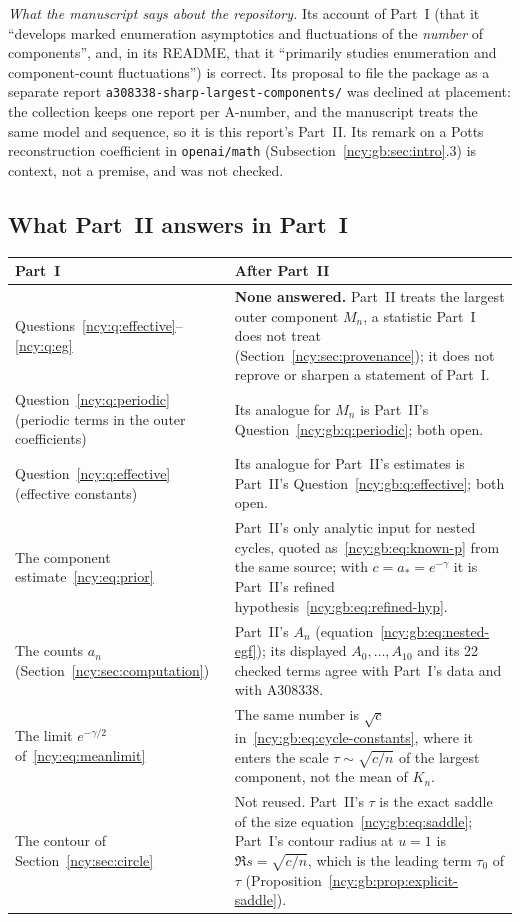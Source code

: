 \documentclass[11pt,letterpaper]{article}
\numberwithin{equation}{section}
\theoremstyle{remark}\newtheorem{remark}[theorem]{Remark}
\newcommand{\file}[1]{\nolinkurl{#1}}
\theoremstyle{definition}\newtheorem{definition}[theorem]{Definition}\theoremstyle{plain}
\begin{document}
\emph{What the manuscript says about the repository.} Its account of
Part~I (that it ``develops marked enumeration asymptotics and fluctuations
of the \emph{number} of components'', and, in its README, that it
``primarily studies enumeration and component-count fluctuations'') is
correct. Its proposal to file the package as a separate report
\file{a308338-sharp-largest-components/} was declined at placement: the
collection keeps one report per A-number, and the manuscript treats the same
model and sequence, so it is this report's Part~II. Its remark on a Potts
reconstruction coefficient in \texttt{openai/math}
(Subsection~\ref{ncy:gb:sec:intro}.3) is context, not a premise, and was not
checked.

\subsection{What Part~II answers in Part~I}\label{ncy:gb:sec:answers}

\begingroup\small
\renewcommand{\arraystretch}{1.12}
\renewcommand{\theHtable}{ncygb.answers}%
\begin{longtable}{@{}>{\raggedright\arraybackslash}p{}>{\raggedright\arraybackslash}p{}@{}}
\toprule
Part~I & After Part~II\\
\midrule
\endhead
Questions~\ref{ncy:q:effective}--\ref{ncy:q:eg} & \textbf{None answered.} Part~II treats the largest outer component $M_n$, a statistic Part~I does not treat (Section~\ref{ncy:sec:provenance}); it does not reprove or sharpen a statement of Part~I.\\
Question~\ref{ncy:q:periodic} (periodic terms in the outer coefficients) & Its analogue for $M_n$ is Part~II's Question~\ref{ncy:gb:q:periodic}; both open.\\
Question~\ref{ncy:q:effective} (effective constants) & Its analogue for Part~II's estimates is Part~II's Question~\ref{ncy:gb:q:effective}; both open.\\
The component estimate~\eqref{ncy:eq:prior} & Part~II's only analytic input for nested cycles, quoted as~\eqref{ncy:gb:eq:known-p} from the same source; with $c=a_*=e^{-\gamma}$ it is Part~II's refined hypothesis~\eqref{ncy:gb:eq:refined-hyp}.\\
The counts $a_n$ (Section~\ref{ncy:sec:computation}) & Part~II's $A_n$ (equation~\eqref{ncy:gb:eq:nested-egf}); its displayed $A_0,\dots,A_{10}$ and its 22 checked terms agree with Part~I's data and with A308338.\\
The limit $e^{-\gamma/2}$ of~\eqref{ncy:eq:meanlimit} & The same number is $\sqrt c$ in~\eqref{ncy:gb:eq:cycle-constants}, where it enters the scale $\tau\sim\sqrt{c/n}$ of the largest component, not the mean of $K_n$.\\
The contour of Section~\ref{ncy:sec:circle} & Not reused. Part~II's $\tau$ is the exact saddle of the size equation~\eqref{ncy:gb:eq:saddle}; Part~I's contour radius at $u=1$ is $\Re s=\sqrt{c/n}$, which is the leading term $\tau_0$ of $\tau$ (Proposition~\ref{ncy:gb:prop:explicit-saddle}).\\
\bottomrule
\end{longtable}
\addtocounter{table}{-1}%
\endgroup
\end{document}
